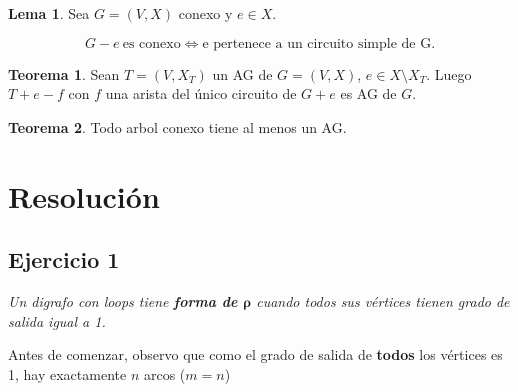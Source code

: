 \documentclass[12pt, a4paper]{report}
\theoremstyle{definition} %
\newtheorem{theorem}{Teorema}
\newtheorem{lemma}{Lema}
\begin{document}
\begin{lemma}\label{lema:tree-g-e}
    Sea $G = (V, X)$ conexo y $e \in X$.

    \[ G - e \ \text{es conexo} \iff \text{e pertenece a un circuito simple de G.} \]
\end{lemma}

\begin{theorem}\label{teo:tree-t-e-f}
    Sean $T = (V, X_T)$ un AG de $G = (V, X)$, $e \in X \setminus X_T$. Luego $T + e - f$ con $f$ una arista del único circuito de $G+e$ es AG de $G$.
\end{theorem}

\begin{theorem}\label{teo:tree/AG}
    Todo arbol conexo tiene al menos un AG.
\end{theorem}

\chapter*{Resolución}

\section*{Ejercicio 1}
\textit{Un digrafo con loops tiene \textbf{forma de $\bm{\rho}$} cuando todos sus vértices tienen grado de salida igual a 1.}

Antes de comenzar, observo que como el grado de salida de \textbf{todos} los vértices es 1, hay exactamente $n$ arcos ($m = n$)
\end{document}
